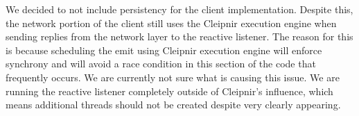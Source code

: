 We decided to not include persistency for the client implementation. Despite this, the network portion of the client still uses the Cleipnir execution engine when sending replies from the network layer to the reactive listener. The reason for this is because scheduling the emit using Cleipnir execution engine will enforce synchrony and will avoid a race condition in this section of the code that frequently occurs. We are currently not sure what is causing this issue. We are running the reactive listener completely outside of Cleipnir's influence, which means additional threads should not be created despite very clearly appearing.